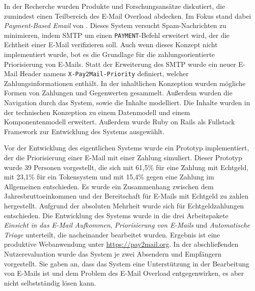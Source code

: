 In der Recherche wurden Produkte und Forschungsansätze diskutiert, die zumindest einen Teilbereich des E-Mail Overload abdecken. Im Fokus stand dabei \textit{Payment-Based Email} von \cite{Turner2003}. Dieses System versucht Spam-Nachrichten zu minimieren, indem SMTP um einen \texttt{PAYMENT}-Befehl erweitert wird, der die Echtheit einer E-Mail verifizieren soll. Auch wenn dieses Konzept nicht implementiert wurde, bot es die Grundlage für die zahlungsorientierte Priorisierung von E-Mails. Statt der Erweiterung des SMTP wurde ein neuer E-Mail Header namens \texttt{X-Pay2Mail-Priority} definiert, welcher Zahlungsinformationen enthält. In der inhaltlichen Konzeption wurden mögliche Formen von Zahlungen und Gegenwerten gesammelt. Außerdem wurden die Navigation durch das System, sowie die Inhalte modelliert. Die Inhalte wurden in der technischen Konzeption zu einem Datenmodell und einem Komponentenmodell erweitert. Außerdem wurde Ruby on Rails als Fullstack Framework zur Entwicklung des Systems ausgewählt.

Vor der Entwicklung des eigentlichen Systems wurde ein Prototyp implementiert, der die Priorisierung einer E-Mail mit einer Zahlung simuliert. Dieser Prototyp wurde 39 Personen vorgestellt, die sich mit 61,5\% für eine Zahlung mit Echtgeld, mit 23,1\% für ein Tokensystem und mit 15,4\% gegen eine Zahlung im Allgemeinen entschieden. Es wurde ein Zusammenhang zwischen dem Jahresbruttoeinkommen und der Bereitschaft für E-Mails mit Echtgeld zu zahlen hergestellt. Aufgrund der absoluten Mehrheit wurde sich für Echtgeldzahlungen entschieden. Die Entwicklung des Systems wurde in die drei Arbeitspakete \textit{Einsicht in das E-Mail Aufkommen}, \textit{Priorisierung von E-Mails} und \textit{Automatische Triage} unterteilt, die nacheinander bearbeitet wurden. Ergebnis ist eine produktive Webanwendung unter \url{https://pay2mail.org}. In der abschließenden Nutzerevaluation wurde das System je zwei Absendern und Empfängern vorgestellt. Sie gaben an, dass das System eine Unterstützung in der Bearbeitung von E-Mails ist und dem Problem des E-Mail Overload entgegenwirken, es aber nicht selbstständig lösen kann.

